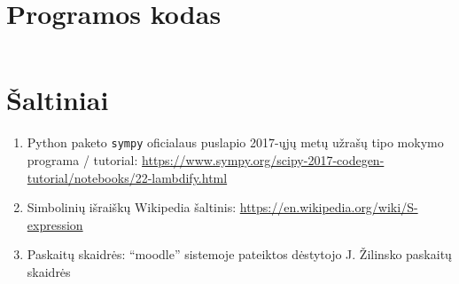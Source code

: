 \documentclass[lithuanian,a4paper,12pt]{article}
\begin{document}
\pagebreak
\section{Programos kodas}
\inputminted{python}{../code/main.py}
\pagebreak

\section{Šaltiniai}
\begin{enumerate}
    \item Python paketo \texttt{sympy} oficialaus puslapio 2017-ųjų metų užrašų tipo mokymo programa / tutorial: \url{https://www.sympy.org/scipy-2017-codegen-tutorial/notebooks/22-lambdify.html}
    \item Simbolinių išraiškų Wikipedia šaltinis: \url{https://en.wikipedia.org/wiki/S-expression}
    \item Paskaitų skaidrės: ``moodle'' sistemoje pateiktos dėstytojo J. Žilinsko paskaitų skaidrės
\end{enumerate}
\end{document}
